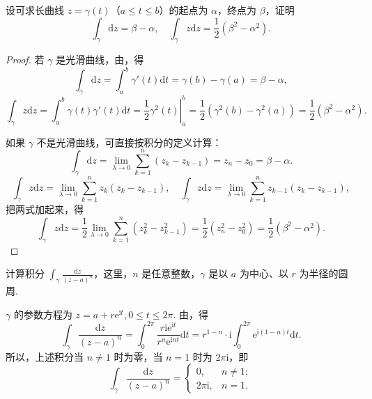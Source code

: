 \documentclass[../../main.tex]{subfiles}
\begin{document}
\begin{example}\label{example:例3.1.3}
设可求长曲线 \( z = \gamma(t) \)（\( a \leqslant t \leqslant b \)）的起点为 \( \alpha \)，终点为 \( \beta \)，证明
\[
\int_\gamma \mathrm{d}z = \beta - \alpha,
\quad
\int_\gamma z \mathrm{d}z = \frac{1}{2}(\beta^2 - \alpha^2).
\]
\end{example}
\begin{proof}
若 \( \gamma \) 是光滑曲线，由，得
\[
\int_\gamma \mathrm{d}z = \int_a^b \gamma'(t)\mathrm{d}t
= \gamma(b) - \gamma(a)
= \beta - \alpha,
\]
\[
\int_\gamma z \mathrm{d}z = \int_a^b \gamma(t)\gamma'(t)\mathrm{d}t
= \left. \frac{1}{2}\gamma^2(t) \right|_a^b
= \frac{1}{2}(\gamma^2(b) - \gamma^2(a))
= \frac{1}{2}(\beta^2 - \alpha^2).
\]

如果 \( \gamma \) 不是光滑曲线，可直接按积分的定义计算：
\[
\int_\gamma \mathrm{d}z = \lim_{\lambda \to 0} \sum_{k = 1}^n (z_k - z_{k - 1})
= z_n - z_0
= \beta - \alpha.
\]
\[
\int_\gamma z \mathrm{d}z = \lim_{\lambda \to 0} \sum_{k = 1}^n z_k(z_k - z_{k - 1}),
\quad
\int_\gamma z \mathrm{d}z = \lim_{\lambda \to 0} \sum_{k = 1}^n z_{k - 1}(z_k - z_{k - 1}),
\]
把两式加起来，得
\[
\int_\gamma z \mathrm{d}z = \frac{1}{2} \lim_{\lambda \to 0} \sum_{k = 1}^n (z_k^2 - z_{k - 1}^2)
= \frac{1}{2}(z_n^2 - z_0^2)
= \frac{1}{2}(\beta^2 - \alpha^2).
\]
\end{proof}

\begin{example}\label{example:例3.1.4}
计算积分 \( \int_\gamma \frac{\mathrm{d}z}{(z - a)^n} \)，这里，\( n \) 是任意整数，\( \gamma \) 是以 \( a \) 为中心、以 \( r \) 为半径的圆周.
\end{example}
\begin{solution}
\( \gamma \) 的参数方程为 \( z = a + r\mathrm{e}^{\mathrm{i}t}, 0 \leqslant t \leqslant 2\pi \). 由，得
\[
\int_\gamma \frac{\mathrm{d}z}{(z - a)^n} = \int_0^{2\pi} \frac{r\mathrm{i}\mathrm{e}^{\mathrm{i}t}}{r^n\mathrm{e}^{\mathrm{i}nt}}\mathrm{d}t
= r^{1 - n}\cdot \mathrm{i}\int_0^{2\pi} \mathrm{e}^{\mathrm{i}(1 - n)t}\mathrm{d}t.
\]
所以，上述积分当 \( n \neq 1 \) 时为零，当 \( n = 1 \) 时为 \( 2\pi\mathrm{i} \)，即
\[
\int_\gamma \frac{\mathrm{d}z}{(z - a)^n} = 
\begin{cases} 
0, & n \neq 1; \\
2\pi\mathrm{i}, & n = 1.
\end{cases}
\]
\end{solution}
\end{document}
